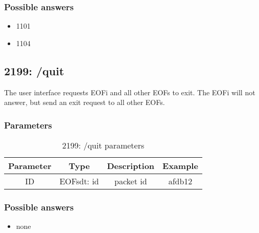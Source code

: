 \subsubsection{Possible answers}
\begin{itemize}
\item 1101
\item 1104
\end{itemize}
\subsection{2199: /quit}
The user interface requests EOFi and all other EOFs to exit.
The EOFi will not answer, but send an exit request to all other
EOFs.

\subsubsection{Parameters}
\begin{longtable}{|c|c|c|c|}
\caption{2199: /quit parameters}\\
\hline
\textbf{Parameter} & \textbf{Type} & \textbf{Description} & \textbf{Example}\\
\hline
ID & EOFsdt: id & packet id & afdb12\\
\hline
\end{longtable}

\subsubsection{Possible answers}
\begin{itemize}
\item none
\end{itemize}

